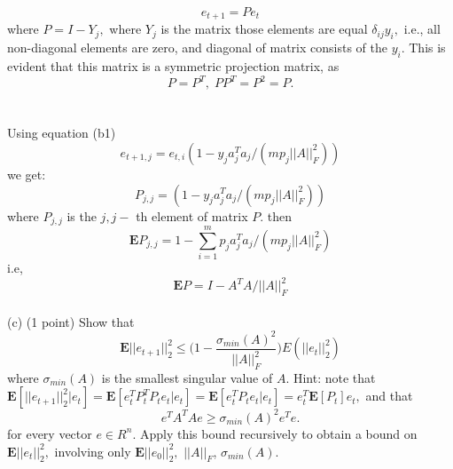 \documentclass{article}
\begin{document}
$$
e_{t + 1} = P e_t
$$
where $P = I - Y_j,$ where $Y_j$ is the matrix those
elements are equal $\delta_{ij} y_i, $ i.e., all non-diagonal elements are zero, and diagonal of matrix consists of the $y_i.$
This is evident that this matrix is a symmetric projection matrix, as 
$$
P = P^T, \; PP^T = P^2 = P.
$$ \\ \\
Using equation (b1) 
$$
e_{t + 1, j} = e_{t, i}(1 - y_j a_j^Ta_j/(m p_j ||A||_F^2))
$$
we get:
$$
P_{j, j} = (1 - y_j a_j^Ta_j/(m p_j ||A||_F^2))
$$
where $P_{j, j}$ is the $j, j-$ th element of matrix $P.$
then
$$
\mathbf{E}P_{j, j} = 1 - \sum_{i=1}^{m} p_j a_j^Ta_j/(m p_j ||A||_F^2) 
$$
i.e, 
$$
\mathbf{E}P = I - A^TA/||A||_F^2
$$
\\

(c) (1 point) Show that\\
$$
\mathbf{E}||e_{t+1}||^2_2 \leq 
\big(1 - \frac{\sigma_{min}(A)^2}{||A||_F^2}\big) E(||e_t||^2_2)
$$
where $\sigma_{min}(A)$ is the smallest singular value of $A.$ Hint: note that 
$
\mathbf{E}[||e_{t+1}||^2_2|e_t] = 
\mathbf{E} [e_t^T P_t^T P_t e_t |e_t] = 
\mathbf{E} [e_t^T P_t e_t |e_t] = 
e_t^T \mathbf{E}[P_t]e_t,$ and that 
$$
e^T A^T A e \geq \sigma_{min}(A)^2 e^T e.
$$
for every vector $e \in R^n.$ Apply this bound recursively to obtain a bound on $\mathbf{E}||e_{t}||^2_2,$ involving only $\mathbf{E}||e_{0}||^2_2,$ $||A||_F$, $\sigma_{min}(A).$
\end{document}
